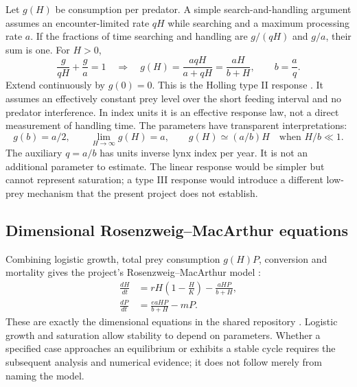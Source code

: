 Let $g(H)$ be consumption per predator. A simple search-and-handling argument
assumes an encounter-limited rate $qH$ while searching and a maximum processing
rate $a$. If the fractions of time searching and handling are $g/(qH)$ and $g/a$,
their sum is one. For $H>0$,
\begin{equation}
\frac{g}{qH}+\frac{g}{a}=1
\quad\Longrightarrow\quad
g(H)=\frac{aqH}{a+qH}=\frac{aH}{b+H},\qquad b=\frac{a}{q}.
\end{equation}
Extend continuously by $g(0)=0$. This is the Holling type II response
\cite{arnav_holling1959}. It assumes an effectively constant prey level over the
short feeding interval and no predator interference. In index units it is an
effective response law, not a direct measurement of handling time. The parameters
have transparent interpretations:
\begin{equation}
g(b)=a/2,\qquad \lim_{H\to\infty}g(H)=a,\qquad
g(H)\simeq(a/b)H\quad\text{when }H/b\ll1.
\end{equation}
The auxiliary $q=a/b$ has units inverse lynx index per year. It is not an additional
parameter to estimate. The linear response would be simpler but cannot represent
saturation; a type III response would introduce a different low-prey mechanism
that the present project does not establish.

\subsection{Dimensional Rosenzweig--MacArthur equations}
Combining logistic growth, total prey consumption $g(H)P$, conversion and mortality
gives the project's Rosenzweig--MacArthur model
\cite{arnav_rosenzweig1963}:
\begin{align}
\frac{dH}{dt}&=rH\left(1-\frac{H}{K}\right)-\frac{aHP}{b+H},\label{eq:arnav_H}\\
\frac{dP}{dt}&=\frac{eaHP}{b+H}-mP.\label{eq:arnav_P}
\end{align}
These are exactly the dimensional equations in the shared repository
\cite{arnav_teamrepo2026}. Logistic
growth and saturation allow stability to depend on parameters. Whether a specified
case approaches an equilibrium or exhibits a stable cycle requires the subsequent
analysis and numerical evidence; it does not follow merely from naming the model.

